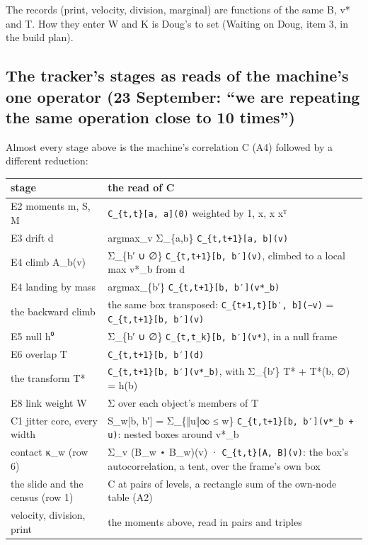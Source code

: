 The records (print, velocity, division, marginal) are functions of the same B, v* and T. How they enter W and K is Doug's to set (Waiting on Doug, item 3, in the build plan).

\subsection{\texorpdfstring{The tracker's stages as reads of the machine's one operator (23 September: “we are repeating the same operation close to 10 times”)}{The tracker's stages as reads of the machine's one operator (23 September: "we are repeating the same operation close to 10 times")}}

Almost every stage above is the machine's correlation C (A4) followed by a different reduction:

{\small
\setlength{\tabcolsep}{6pt}
\begin{longtable}{>{\RaggedRight\arraybackslash}p{}>{\RaggedRight\arraybackslash}p{}}
\toprule
stage & the read of C \\
\midrule
\endhead
E2 moments m, S, M & \texttt{C\_\allowbreak{}\{t,t\}[a, a](0)} weighted by 1, x, x xᵀ \\
E3 drift d & argmax\_\allowbreak{}v Σ\_\allowbreak{}\{a,b\} \texttt{C\_\allowbreak{}\{t,t+1\}[a, b](v)} \\
E4 climb A\_\allowbreak{}b(v) & Σ\_\allowbreak{}\{b′ ∪ ∅\} \texttt{C\_\allowbreak{}\{t,t+1\}[b, b′](v)}, climbed to a local max v*\_\allowbreak{}b from d \\
E4 landing by mass & argmax\_\allowbreak{}\{b′\} \texttt{C\_\allowbreak{}\{t,t+1\}[b, b′](v*\_\allowbreak{}b)} \\
the backward climb & the same box transposed: \texttt{C\_\allowbreak{}\{t+1,t\}[b′, b](−v)} = \texttt{C\_\allowbreak{}\{t,t+1\}[b, b′](v)} \\
E5 null h⁰ & Σ\_\allowbreak{}\{b′ ∪ ∅\} \texttt{C\_\allowbreak{}\{t,t\_\allowbreak{}k\}[b, b′](v*)}, in a null frame \\
E6 overlap T & \texttt{C\_\allowbreak{}\{t,t+1\}[b, b′](d)} \\
the transform T* & \texttt{C\_\allowbreak{}\{t,t+1\}[b, b′](v*\_\allowbreak{}b)}, with Σ\_\allowbreak{}\{b′\} T* + T*(b, ∅) = h(b) \\
E8 link weight W & Σ over each object's members of T \\
C1 jitter core, every width & S\_\allowbreak{}w[b, b′] = Σ\_\allowbreak{}\{‖u‖∞ ≤ w\} \texttt{C\_\allowbreak{}\{t,t+1\}[b, b′](v*\_\allowbreak{}b + u)}: nested boxes around v*\_\allowbreak{}b \\
contact κ\_\allowbreak{}w (row 6) & Σ\_\allowbreak{}v (B\_\allowbreak{}w ⋆ B\_\allowbreak{}w)(v) · \texttt{C\_\allowbreak{}\{t,t\}[A, B](v)}: the box's autocorrelation, a tent, over the frame's own box \\
the slide and the census (row 1) & C at pairs of levels, a rectangle sum of the own-node table (A2) \\
velocity, division, print & the moments above, read in pairs and triples \\
\bottomrule
\end{longtable}
}

